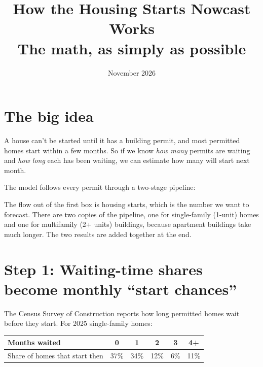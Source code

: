 \documentclass[11pt]{article}
\title{How the Housing Starts Nowcast Works\\[4pt]\large The math, as simply as possible}
\author{}
\date{November 2026}
\begin{document}
\maketitle

\section{The big idea}

A house can't be started until it has a building permit, and most permitted
homes start within a few months. So if we know \emph{how many} permits are
waiting and \emph{how long} each has been waiting, we can estimate how many
will start next month.

The model follows every permit through a two-stage pipeline:

\begin{center}
\end{center}

The flow out of the first box is housing starts, which is the number we want
to forecast. There are two copies of the pipeline, one for single-family
(1-unit) homes and one for multifamily (2+ units) buildings, because
apartment buildings take much longer. The two results are added together at
the end.

\section{Step 1: Waiting-time shares become monthly ``start chances''}

The Census Survey of Construction reports how long permitted homes wait
before they start. For 2025 single-family homes:

\begin{center}
\begin{tabular}{lccccc}
\toprule
Months waited & 0 & 1 & 2 & 3 & 4+ \\
\midrule
Share of homes that start then & 37\% & 34\% & 12\% & 6\% & 11\% \\
\bottomrule
\end{tabular}
\end{center}
\end{document}
